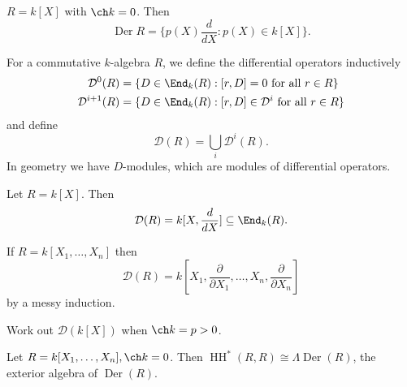 \documentclass[a4paper]{article}
\DeclareMathOperator{\HH}{HH}
\DeclareMathOperator{\Der}{Der}
\begin{document}
\begin{eg}
  \(R = k[X]\) with \(\ch k = 0\). Then
  \[
    \Der R = \{p(X) \frac{d}{dX}: p(X) \in k[X]\}.
  \]
\end{eg}

For a commutative \(k\)-algebra \(R\), we define the differential operators inductively
\begin{align*}
  \mathcal D^0(R) &= \{D \in \End_k(R): [r, D] = 0 \text{ for all } r \in R\} \\
  \mathcal D^{i + 1} (R) &= \{D \in \End_k(R): [r, D] \in \mathcal D^i \text{ for all } r \in R\} \\
\end{align*}
and define
\[
  \mathcal D(R) = \bigcup_i \mathcal D^i(R).
\]
In geometry we have \(D\)-modules, which are modules of differential operators.

\begin{eg}
  Let \(R = k[X]\). Then
  \[
    \mathcal D(R) = k[X, \frac{d}{dX}] \subseteq \End_k(R).
  \]

  If \(R = k[X_1, \dots, X_n]\) then
  \[
    \mathcal D(R) = k[X_1, \frac{\partial  }{\partial X_1}, \dots, X_n, \frac{\partial  }{\partial X_n}]
  \]
  by a messy induction.
\end{eg}

\begin{ex}
  Work out \(\mathcal D(k[X])\) when \(\ch k = p > 0\).
\end{ex}

\begin{theorem}
  Let \(R = k[X_1, \dots, X_n], \ch k = 0\). Then \(\HH^*(R, R) \cong \Lambda \Der (R)\), the exterior algebra of \(\Der(R)\).
\end{theorem}





\printindex
\end{document}
